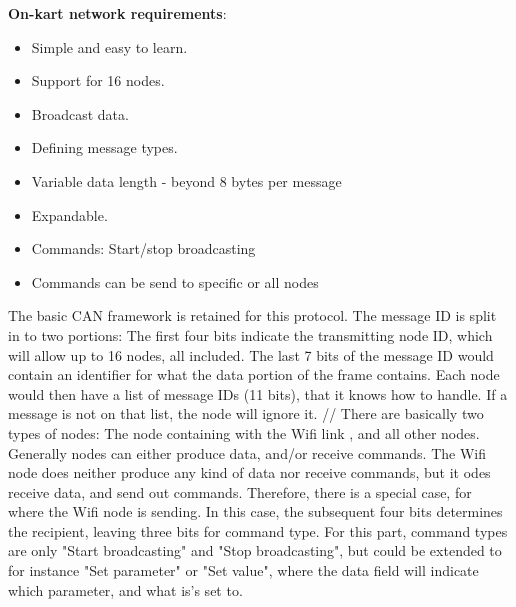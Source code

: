 
\textbf{On-kart network requirements}:
\begin{itemize}
	\item Simple and easy to learn.
	\item Support for 16 nodes.
	\item Broadcast data.
	\item Defining message types.
	\item Variable data length - beyond 8 bytes per message
	\item Expandable.
	\item Commands: Start/stop broadcasting 
	\item Commands can be send to specific or all nodes
\end{itemize}

The basic CAN framework is retained for this protocol. 
The message ID is split in to two portions: The first four bits indicate the transmitting node ID, which will allow up to 16 nodes, all included. 
The last 7 bits of the message ID would contain an identifier for what the data portion of the frame contains.
Each node would then have a list of message IDs (11 bits), that it knows how to handle.
If a message is not on that list, the node will ignore it.
//
There are basically two types of nodes: The node containing with the Wifi link , and all other nodes.
Generally nodes can either produce data, and/or receive commands.
The Wifi node does neither produce any kind of data nor receive commands, but it odes receive data, and send out commands.
Therefore, there is a special case, for where the Wifi node is sending.
In this case, the subsequent four bits determines the recipient, leaving three bits for command type. 
For this part, command types are only "Start broadcasting" and "Stop broadcasting", but could be extended to for instance "Set parameter" or "Set value", where the data field will indicate which parameter, and what is's set to.


